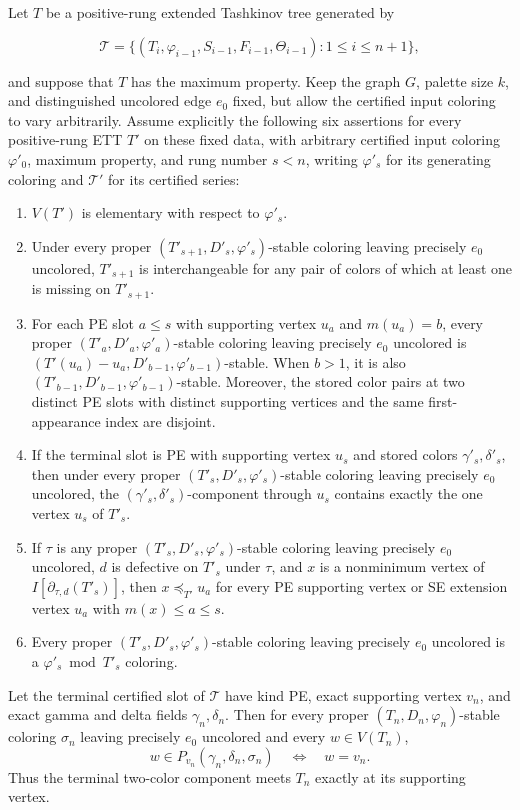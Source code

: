 \begin{lemma}
Let \(T\) be a positive-rung extended Tashkinov tree generated by

\[
 \mathcal T=\{(T_i,\varphi_{i-1},S_{i-1},F_{i-1},\Theta_{i-1}):
                   1\leq i\leq n+1\},
\]

and suppose that \(T\) has the maximum property.  Keep the graph \(G\),
palette size \(k\), and distinguished uncolored edge \(e_0\) fixed, but
allow the certified input coloring to vary arbitrarily.  Assume explicitly
the following six assertions for every positive-rung ETT \(T'\) on these
fixed data, with arbitrary certified input coloring \(\varphi'_0\), maximum
property, and rung number \(s<n\), writing \(\varphi'_s\) for its generating
coloring and \(\mathcal T'\) for its certified series:
\begin{enumerate}
\item \(V(T')\) is elementary with respect to \(\varphi'_s\).
\item Under every proper \((T'_{s+1},D'_s,\varphi'_s)\)-stable coloring
leaving precisely \(e_0\) uncolored, \(T'_{s+1}\) is interchangeable for
any pair of colors of which at least one is missing on \(T'_{s+1}\).
\item For each PE slot \(a\leq s\) with supporting vertex \(u_a\) and
\(m(u_a)=b\), every proper \((T'_a,D'_a,\varphi'_a)\)-stable coloring
leaving precisely \(e_0\) uncolored is
\((T'(u_a)-u_a,D'_{b-1},\varphi'_{b-1})\)-stable.  When \(b>1\), it is
also \((T'_{b-1},D'_{b-1},\varphi'_{b-1})\)-stable.  Moreover, the stored
color pairs at two distinct PE slots with distinct supporting vertices
and the same first-appearance index are disjoint.
\item If the terminal slot is PE with supporting vertex \(u_s\) and
stored colors \(\gamma'_s,\delta'_s\), then under every proper
\((T'_s,D'_s,\varphi'_s)\)-stable coloring leaving precisely \(e_0\)
uncolored, the \((\gamma'_s,\delta'_s)\)-component through \(u_s\)
contains exactly the one vertex \(u_s\) of \(T'_s\).
\item If \(\tau\) is any proper \((T'_s,D'_s,\varphi'_s)\)-stable
coloring leaving precisely \(e_0\) uncolored, \(d\) is defective on
\(T'_s\) under \(\tau\), and \(x\) is a nonminimum vertex of
\(I[\partial_{\tau,d}(T'_s)]\), then
\(x\preceq_{T'}u_a\) for every PE supporting vertex or SE extension
vertex \(u_a\) with \(m(x)\leq a\leq s\).
\item Every proper \((T'_s,D'_s,\varphi'_s)\)-stable coloring leaving
precisely \(e_0\) uncolored is a \(\varphi'_s\bmod T'_s\) coloring.
\end{enumerate}

Let the terminal certified slot of \(\mathcal T\) have kind PE, exact
supporting vertex \(v_n\), and exact gamma and delta fields
\(\gamma_n,\delta_n\).  Then for every proper
\((T_n,D_n,\varphi_n)\)-stable coloring \(\sigma_n\) leaving precisely
\(e_0\) uncolored and every \(w\in V(T_n)\),
\[
 w\in P_{v_n}(\gamma_n,\delta_n,\sigma_n)
       \quad\Longleftrightarrow\quad w=v_n.
\]
Thus the terminal two-color component meets \(T_n\) exactly at its
supporting vertex.
\end{lemma}
